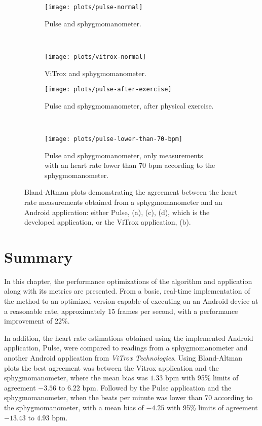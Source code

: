\begin{figure}[p]
  \begin{subfigure}{0.5\textwidth}
    \texttt{[image: plots/pulse-normal]}
    \caption{Pulse and sphygmomanometer.}
    \label{fig:plots:heart:pulse:normal}
  \end{subfigure}
  ~
  \begin{subfigure}{0.5\textwidth}
    \texttt{[image: plots/vitrox-normal]}
    \caption{ViTrox and sphygmomanometer.}
    \label{fig:plots:heart:vitrox:normal}
  \end{subfigure}

  \begin{subfigure}{0.5\textwidth}
    \texttt{[image: plots/pulse-after-exercise]}
    \caption{Pulse and sphygmomanometer, after physical exercise.}
    \label{fig:plots:heart:pulse:exercise}
  \end{subfigure}
  ~
  \begin{subfigure}{0.5\textwidth}
    \texttt{[image: plots/pulse-lower-than-70-bpm]}
    \caption{
      Pulse and sphygmomanometer, only measurements with an heart rate lower
      than 70 bpm according to the sphygmomanometer.
    }
    \label{fig:plots:heart:pulse:low}
  \end{subfigure}

  \caption{
    Bland-Altman plots demonstrating the agreement between the heart rate
    measurements obtained from a sphygmomanometer and an Android application:
    either Pulse, (a), (c), (d), which is the developed application,
    or the ViTrox application, (b).
  }
  \label{fig:plots:heart}
\end{figure}

\pagebreak

\section{Summary}

In this chapter, the performance optimizations of the algorithm and application
along with its metrics are presented. From a basic, real-time
implementation of the \evm{} method to an optimized version capable of
executing on an Android device at a reasonable rate, approximately
15 frames per second, with a performance improvement of 22\%.

In addition, the heart rate estimations obtained using the
implemented Android application, Pulse, were compared to readings
from a sphygmomanometer and another Android application from
\emph{ViTrox Technologies}. Using Bland-Altman plots the best agreement
was between the Vitrox application and the sphygmomanometer, where the mean
bias was $1.33$ bpm with 95\% limits of agreement $-3.56$ to $6.22$ bpm.
Followed by the Pulse application and the sphygmomanometer, when the
beats per minute was lower than 70 according to the sphygmomanometer, with a
mean bias of $-4.25$ with 95\% limits of agreement $-13.43$ to $4.93$ bpm.
